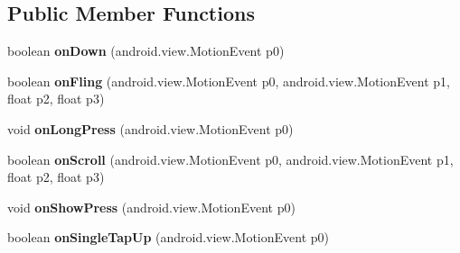 \subsection*{Public Member Functions}
\begin{DoxyCompactItemize}
\item 
\mbox{\label{classmd5b60ffeb829f638581ab2bb9b1a7f4f3f_1_1InnerGestureListener_a040c94c7721114d95025411a4eed94ff}} 
boolean {\bfseries on\+Down} (android.\+view.\+Motion\+Event p0)
\item 
\mbox{\label{classmd5b60ffeb829f638581ab2bb9b1a7f4f3f_1_1InnerGestureListener_a1756e2693a60f1d3742380e89f01051f}} 
boolean {\bfseries on\+Fling} (android.\+view.\+Motion\+Event p0, android.\+view.\+Motion\+Event p1, float p2, float p3)
\item 
\mbox{\label{classmd5b60ffeb829f638581ab2bb9b1a7f4f3f_1_1InnerGestureListener_a6ba34beec4f15b2b99e347516a70bf48}} 
void {\bfseries on\+Long\+Press} (android.\+view.\+Motion\+Event p0)
\item 
\mbox{\label{classmd5b60ffeb829f638581ab2bb9b1a7f4f3f_1_1InnerGestureListener_acc5b84dc58658cb693ceb013d18483d0}} 
boolean {\bfseries on\+Scroll} (android.\+view.\+Motion\+Event p0, android.\+view.\+Motion\+Event p1, float p2, float p3)
\item 
\mbox{\label{classmd5b60ffeb829f638581ab2bb9b1a7f4f3f_1_1InnerGestureListener_a4a73104a37519a590fd0d475acd83095}} 
void {\bfseries on\+Show\+Press} (android.\+view.\+Motion\+Event p0)
\item 
\mbox{\label{classmd5b60ffeb829f638581ab2bb9b1a7f4f3f_1_1InnerGestureListener_ade097b243cdda0818112d29738cad2ae}} 
boolean {\bfseries on\+Single\+Tap\+Up} (android.\+view.\+Motion\+Event p0)
\item 
\mbox{\label{classmd5b60ffeb829f638581ab2bb9b1a7f4f3f_1_1InnerGestureListener_a8c613557a8dfb0a91caaf5e981d6958f}} 

\end{DoxyCompactItemize}
